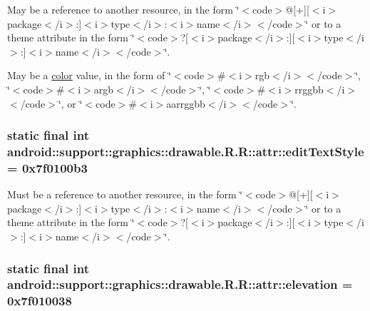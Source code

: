 May be a reference to another resource, in the form \char`\"{}$<$code$>$@\mbox{[}+\mbox{]}\mbox{[}$<$i$>$package$<$/i$>$:\mbox{]}$<$i$>$type$<$/i$>$:$<$i$>$name$<$/i$>$$<$/code$>$\char`\"{} or to a theme attribute in the form \char`\"{}$<$code$>$?\mbox{[}$<$i$>$package$<$/i$>$:\mbox{]}\mbox{[}$<$i$>$type$<$/i$>$:\mbox{]}$<$i$>$name$<$/i$>$$<$/code$>$\char`\"{}. 

May be a \hyperlink{classandroid_1_1support_1_1graphics_1_1drawable_1_1_r_1_1color}{color} value, in the form of \char`\"{}$<$code$>$\#$<$i$>$rgb$<$/i$>$$<$/code$>$\char`\"{}, \char`\"{}$<$code$>$\#$<$i$>$argb$<$/i$>$$<$/code$>$\char`\"{}, \char`\"{}$<$code$>$\#$<$i$>$rrggbb$<$/i$>$$<$/code$>$\char`\"{}, or \char`\"{}$<$code$>$\#$<$i$>$aarrggbb$<$/i$>$$<$/code$>$\char`\"{}. \hypertarget{classandroid_1_1support_1_1graphics_1_1drawable_1_1_r_1_1attr_c616fbcbebf5d253669d1fd6a750ef3d}{
\subsubsection[{editTextStyle}]{\setlength{\rightskip}{0pt plus 5cm}static final int android::support::graphics::drawable.R.R::attr::editTextStyle = 0x7f0100b3}}
\label{classandroid_1_1support_1_1graphics_1_1drawable_1_1_r_1_1attr_c616fbcbebf5d253669d1fd6a750ef3d}


Must be a reference to another resource, in the form \char`\"{}$<$code$>$@\mbox{[}+\mbox{]}\mbox{[}$<$i$>$package$<$/i$>$:\mbox{]}$<$i$>$type$<$/i$>$:$<$i$>$name$<$/i$>$$<$/code$>$\char`\"{} or to a theme attribute in the form \char`\"{}$<$code$>$?\mbox{[}$<$i$>$package$<$/i$>$:\mbox{]}\mbox{[}$<$i$>$type$<$/i$>$:\mbox{]}$<$i$>$name$<$/i$>$$<$/code$>$\char`\"{}. \hypertarget{classandroid_1_1support_1_1graphics_1_1drawable_1_1_r_1_1attr_e63fd488091d33917135ee0aa13f7313}{
\subsubsection[{elevation}]{\setlength{\rightskip}{0pt plus 5cm}static final int android::support::graphics::drawable.R.R::attr::elevation = 0x7f010038}}
\label{classandroid_1_1support_1_1graphics_1_1drawable_1_1_r_1_1attr_e63fd488091d33917135ee0aa13f7313}


